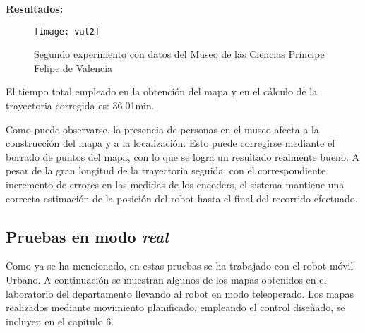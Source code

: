 \textbf{Resultados:}
\begin{figure}[h]
  \centering\texttt{[image: val2]}\\
  \caption{Segundo experimento con datos del Museo de las Ciencias Príncipe Felipe de Valencia}\label{fg:val2}
\end{figure}

El tiempo total empleado en la obtención del mapa y en el cálculo de la trayectoria corregida es: 36.01min.

\vspace{0.2cm}
\noindent
Como puede observarse, la presencia de personas en el museo afecta a la construcción del mapa y a la localización. Esto puede corregirse mediante el borrado de puntos del mapa, con lo que se logra un resultado realmente bueno. A pesar de la gran longitud de la trayectoria seguida, con el correspondiente incremento de errores en las medidas de los encoders, el sistema mantiene una correcta estimación de la posición del robot hasta el final del recorrido efectuado.

\subsection{Pruebas en modo \emph{real}}
Como ya se ha mencionado, en estas pruebas se ha trabajado con el robot móvil Urbano. A continuación se muestran algunos de los mapas obtenidos en el laboratorio del departamento llevando al robot en modo teleoperado. Los mapas realizados mediante movimiento planificado, empleando el control diseñado, se incluyen en el capítulo 6.
